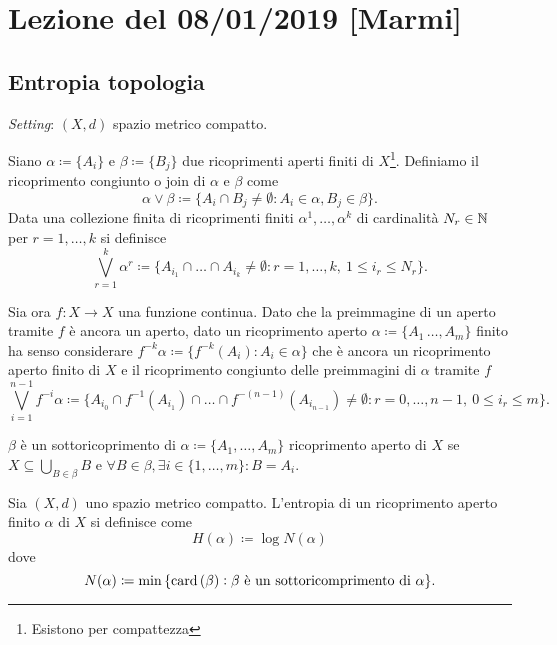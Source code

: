 \section{Lezione del 08/01/2019 [Marmi]}

\subsection{Entropia topologia}

\emph{Setting}: $ (X, d) $ spazio metrico compatto.

\begin{definition}
    Siano $ \alpha \coloneqq \{A_i\} $ e $ \beta \coloneqq \{B_j\} $ due ricoprimenti aperti finiti di $ X $\footnote{Esistono per compattezza}. Definiamo il ricoprimento congiunto o join di $ \alpha $ e $ \beta $ come
    \[
        \alpha \vee \beta \coloneqq \{A_i \cap B_j \neq \emptyset : A_i \in \alpha, B_j \in \beta\}.
    \]
    Data una collezione finita di ricoprimenti finiti $ \alpha^1, \ldots, \alpha^k $ di cardinalità $ N_r \in \mathbb{N} $ per $ r = 1, \ldots, k $ si definisce
    \[
        \bigvee_{r=1}^{k} \alpha^r \coloneqq \{A_{i_1} \cap \ldots \cap A_{i_k} \neq \emptyset : r = 1, \ldots, k, \ 1 \leq i_r \leq N_r\}.
    \]
\end{definition}

Sia ora $ f \colon X \to X $ una funzione continua. Dato che la preimmagine di un aperto tramite $ f $ è ancora un aperto, dato un ricoprimento aperto $ \alpha \coloneqq \{A_1\, \ldots, A_m\} $ finito ha senso considerare $ f^{-k}\alpha \coloneqq \{f^{-k}(A_i) : A_i \in \alpha\} $ che è ancora un ricoprimento aperto finito di $ X $ e il ricoprimento congiunto delle preimmagini di $ \alpha $ tramite $ f $
\[
    \bigvee_{i=1}^{n-1} f^{-i}\alpha \coloneqq \{A_{i_0} \cap f^{-1}(A_{i_1}) \cap \ldots \cap f^{-(n-1)}(A_{i_{n-1}}) \neq \emptyset : r = 0, \ldots, n-1, \ 0 \leq i_r \leq m\}.
\]

\begin{definition}[sottoricoprimento]
    $ \beta $ è un sottoricoprimento di $ \alpha \coloneqq \{A_1, \ldots, A_m\} $ ricoprimento aperto di $ X $ se $ X \subseteq \bigcup_{B \in \beta} B $ e $ \forall B \in \beta, \exists i \in \{1, \ldots, m\} : B = A_i $.
\end{definition}

\begin{definition}
    Sia $ (X, d) $ uno spazio metrico compatto. L'entropia di un ricoprimento aperto finito $ \alpha $ di $ X $ si definisce come
    \[
        H(\alpha) \coloneqq \log N(\alpha)
    \]
    dove
    \[
        N(\alpha) \coloneqq \min{\{\operatorname{card}{(\beta)} : \text{$ \beta $ è un sottoricomprimento di $ \alpha $}}\}.
    \]
\end{definition}

